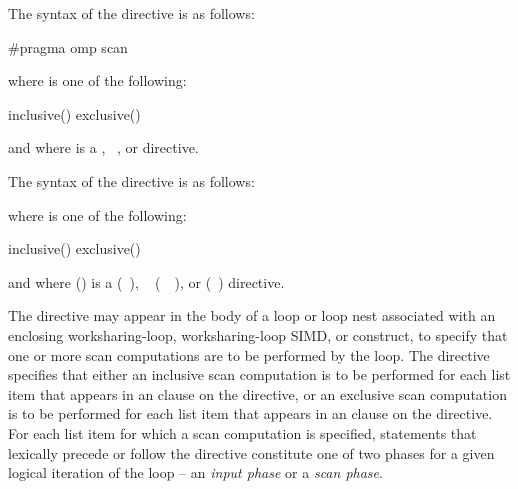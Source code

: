 \syntax
\begin{ccppspecific}
The syntax of the  directive is as follows:

\begin{ompcPragma}
{
   #pragma omp scan  
}
\end{ompcPragma}

where  is one of the following:
\begin{indentedcodelist}
inclusive()
exclusive()
\end{indentedcodelist}

and where  is a , ~, or
 directive.

\end{ccppspecific}

\begin{fortranspecific}
The syntax of the  directive is as follows:


where  is one of the following:
\begin{indentedcodelist}
inclusive()
exclusive()
\end{indentedcodelist}

and where  () is a 
(~), ~
(~~), or
 (~) directive.

\end{fortranspecific}

\descr
The  directive may appear in the body of a loop or loop nest
associated with an enclosing worksharing-loop, worksharing-loop SIMD, or  construct, to
specify that one or more scan computations are to be performed by the loop.
The directive specifies that either an inclusive scan computation is to be performed
for each list item that appears in an  clause on the
directive, or an exclusive scan computation is to be performed for each list item that
appears in an  clause on the directive.  For each list item
for which a scan computation is specified, statements that lexically precede
or follow the directive constitute one of two phases for a given logical
iteration of the loop -- an \textit{input phase} or a \textit{scan phase}. 

